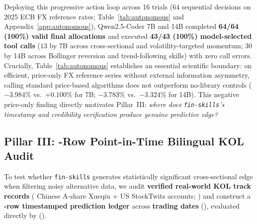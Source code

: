 Deploying this progressive action loop across 16 trials ($64$ sequential decisions on 2025 ECB FX reference rates; Table~\ref{tab:autonomous} and Appendix~\ref{app:autonomous}), Qwen2.5-Coder 7B and 14B completed \textbf{64/64 (100\%) valid final allocations} and executed \textbf{43/43 (100\%) model-selected tool calls} ($13$ by 7B across cross-sectional and volatility-targeted momentum; $30$ by 14B across Bollinger reversion and trend-following skills) with zero call errors. Crucially, Table~\ref{tab:autonomous} establishes an essential scientific boundary: on efficient, price-only FX reference series without external information asymmetry, calling standard price-based algorithms does not outperform no-library controls ($-3.984\%$ vs.\ $+0.100\%$ for 7B; $-3.783\%$ vs.\ $-3.324\%$ for 14B). This negative price-only finding directly motivates Pillar~III: \emph{where does \texttt{fin-skills}'s timestamp and credibility verification produce genuine predictive edge?}

\subsection{Pillar III: \KOLPredRows{}-Row Point-in-Time Bilingual KOL Audit}
\label{sec:realworld}

To test whether \texttt{fin-skills} generates statistically significant cross-sectional edge when filtering noisy alternative data, we audit \textbf{\KOLTotalAccounts{} verified real-world KOL track records} (\KOLCNCount{} Chinese A-share Xueqiu + \KOLUSCount{} US StockTwits accounts; ) and construct a \textbf{\KOLPredRows{}-row timestamped prediction ledger} across \textbf{\KOLTradingDates{} trading dates} (), evaluated directly by  ().

